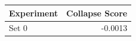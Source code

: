\begin{tabular}{lr}
\toprule
Experiment & Collapse Score \\
\midrule
Set 0 & -0.0013 \\
\bottomrule
\end{tabular}
